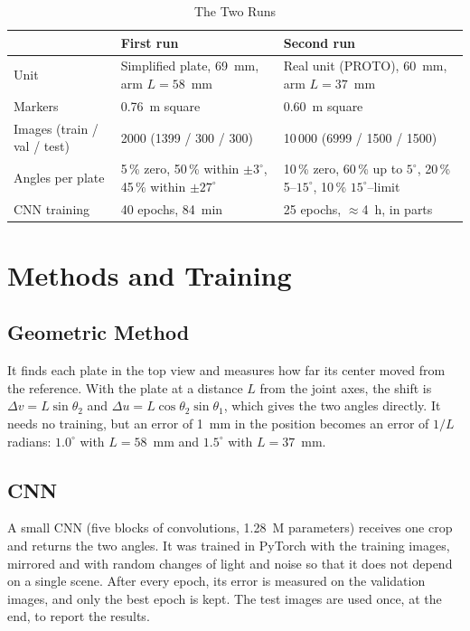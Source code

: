 \documentclass[lettersize,journal]{IEEEtran}
\begin{document}
	\begin{table}[!t]
		\centering
		\caption{The Two Runs}
		\label{tab:runs}
		\scriptsize
		\setlength{\tabcolsep}{2pt}
		\renewcommand{\arraystretch}{1.08}
		\begin{tabularx}{\columnwidth}{@{}P{2.0cm} Y Y@{}}
			\toprule
			& First run & Second run\\
			\midrule
			Unit & Simplified plate, 69~mm, arm $L=58$~mm & Real unit (PROTO), 60~mm, arm $L=37$~mm\\
			Markers & 0.76~m square & 0.60~m square\\
			Images (train / val / test) & 2000 (1399 / 300 / 300) & 10\,000 (6999 / 1500 / 1500)\\
			Angles per plate & 5\,\% zero, 50\,\% within $\pm3^\circ$, 45\,\% within $\pm27^\circ$ & 10\,\% zero, 60\,\% up to $5^\circ$, 20\,\% 5--$15^\circ$, 10\,\% $15^\circ$--limit\\
			CNN training & 40 epochs, 84~min & 25 epochs, $\approx$4~h, in parts\\
			\bottomrule
		\end{tabularx}
	\end{table}


	\section{Methods and Training}

	\subsection{Geometric Method}

	It finds each plate in the top view and measures how far its center moved from the reference. With the plate at a distance $L$ from the joint axes, the shift is $\Delta v = L\sin\theta_2$ and $\Delta u = L\cos\theta_2\sin\theta_1$, which gives the two angles directly. It needs no training, but an error of 1~mm in the position becomes an error of $1/L$ radians: $1.0^\circ$ with $L=58$~mm and $1.5^\circ$ with $L=37$~mm.

	\subsection{CNN}

	A small CNN (five blocks of convolutions, 1.28~M parameters) receives one crop and returns the two angles. It was trained in PyTorch \cite{pytorch} with the training images, mirrored and with random changes of light and noise so that it does not depend on a single scene. After every epoch, its error is measured on the validation images, and only the best epoch is kept. The test images are used once, at the end, to report the results.
\end{document}

